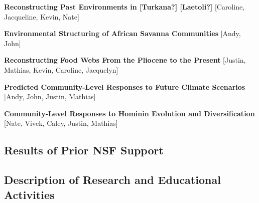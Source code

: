 \documentclass[11pt]{article}
\begin{document}
\vspace{5 mm}

\noindent \textbf{Reconstructing Past Environments in [Turkana?] [Laetoli?]}
[Caroline, Jacqueline, Kevin, Nate]

\vspace{5 mm}

\noindent \textbf{Environmental Structuring of African Savanna Communities}
[Andy, John]

\vspace{5 mm}

\noindent \textbf{Reconstructing Food Webs From the Pliocene to the Present}
[Justin, Mathias, Kevin, Caroline, Jacquelyn]

\vspace{5 mm}

\noindent \textbf{Predicted Community-Level Responses to Future Climate Scenarios}
[Andy, John, Justin, Mathias]

\vspace{5 mm}

\noindent \textbf{Community-Level Responses to Hominin Evolution and Diversification}
[Nate, Vivek, Caley, Justin, Mathias]


\newpage

\subsection*{\large \textbf{Results of Prior NSF Support}}\vspace{-2mm}

\subsection*{\large \textbf{Description of Research and Educational Activities}}\vspace{-2mm}







\pagebreak
{}      %
\setcounter{page}{1}

%
%
\end{document}
